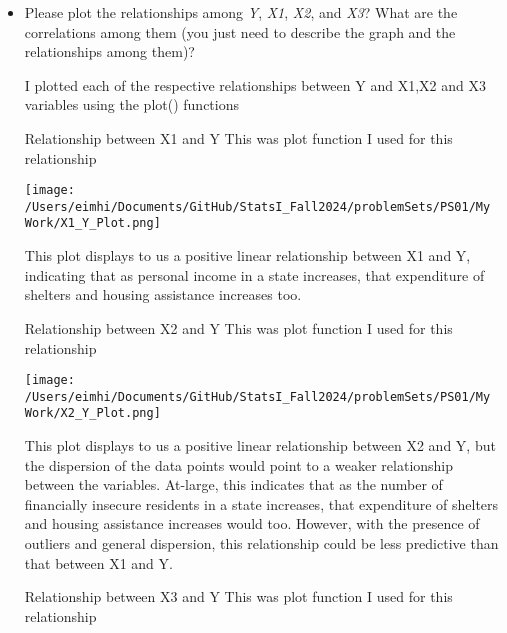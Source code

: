\documentclass[12pt,letterpaper]{article}
\begin{document}
    \newpage

\begin{itemize}
    \item Please plot the relationships among \emph{Y}, \emph{X1}, \emph{X2}, and \emph{X3}? What are the correlations among them (you just need to describe the graph and the relationships among them)?
    
    \centering
    I plotted each of the respective relationships between Y and X1,X2 and X3 variables using the plot() functions
    
    Relationship between X1 and Y
    This was plot function I used for this relationship
    	
    	
   
        \texttt{[image: /Users/eimhi/Documents/GitHub/StatsI\_Fall2024/problemSets/PS01/My Work/X1\_Y\_Plot.png]}
        
    This plot displays to us a positive linear relationship between X1 and Y, indicating that as personal income in a state increases, that expenditure of shelters and housing assistance increases too.
    
    \newpage

    Relationship between X2 and Y
    This was plot function I used for this relationship
        

        \texttt{[image: /Users/eimhi/Documents/GitHub/StatsI\_Fall2024/problemSets/PS01/My Work/X2\_Y\_Plot.png]}

    This plot displays to us a positive linear relationship between X2 and Y, but the dispersion of the data points would point to a weaker relationship between the variables. At-large, this indicates that as the number of financially insecure residents in a state increases, that expenditure of shelters and housing assistance increases would too. However, with the presence of outliers and general dispersion, this relationship could be less predictive than that between X1 and Y.

    \newpage

    Relationship between X3 and Y
    This was plot function I used for this relationship
    
    

\end{itemize}
\end{document}
